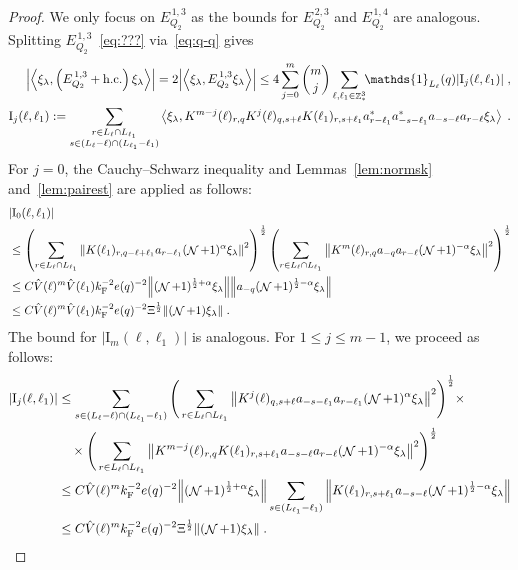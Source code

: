 \documentclass[12pt,a4paper]{article}
\numberwithin{equation}{section}
\newcommand{\1}{\mathbb{I}}
\newcommand{\F}{\mathrm{F}}
\newcommand{\I}{\mathrm{I}}
\DeclareMathOperator{\Z}{\mathbb{Z}}
\DeclareMathOperator{\NN}{\mathcal{N}}
\newcommand{\half}{\frac{1}{2}}
\newcommand{\eva}[1]{\left\langle #1 \right\rangle}
\theoremstyle{plain}
\theoremstyle{definition}
\theoremstyle{remark}
\theoremstyle{plain}
\theoremstyle{definition}
\theoremstyle{remark}
\begin{document}
\begin{proof}
We only focus on $ E^{\,1,3}_{Q_2} $ as the bounds for $ E^{\,2,3}_{Q_2} $ and $ E^{\,1,4}_{Q_2} $ are analogous. Splitting $ E^{\,1,3}_{Q_2} $~\eqref{eq:???} via~\eqref{eq:q-q} gives
\begin{equation} \label{eq:EQ2131}
\begin{aligned}
	\abs{\eva{\xi_\lambda,\left(E^{\,1,3}_{Q_2}+\mathrm{h.c.}\right) \xi_\lambda }} 
	= 2\abs{\eva{\xi_\lambda, E^{\,1,3}_{Q_2} \xi_\lambda }}
	\le 4 \sum_{j=0}^m {{m}\choose j} \sum\limits_{\ell,\ell_1  \in \Z^3_*}\!\! \mathds{1}_{L_\ell}(q) |\I_j(\ell, \ell_1)| \;,\\
	\I_j(\ell, \ell_1)
	:= \sum\limits_{\substack{r\in L_{\ell} \cap L_{\ell_1}\\ s \in (L_{\ell} - \ell) \cap (L_{\ell_1} - \ell_1)}}
		\eva{\xi_\lambda, K^{m-j}(\ell)_{r,q} K^{j}(\ell)_{q,s+\ell} K(\ell_1)_{r,s+\ell_1} a^*_{r-\ell_1} a^*_{-s-\ell_1} a_{-s-\ell} a_{r-\ell} \xi_\lambda} \;. \\
\end{aligned}
\end{equation}
For $ j = 0 $, the Cauchy--Schwarz inequality and Lemmas~\ref{lem:normsk} and~\ref{lem:pairest} are applied as follows:
\begin{align}
	&|\I_0(\ell, \ell_1)| \nonumber\\
	&\leq \left(\sum\limits_{r\in L_{\ell} \cap L_{\ell_1}} \norm{ K(\ell_1)_{r,q-\ell+\ell_1} a_{r-\ell_1}(\NN+1)^{\alpha} \xi_\lambda}^2\right)^\half
		\left(\sum\limits_{r\in L_{\ell} \cap L_{\ell_1}} \norm{ K^m(\ell)_{r,q} a_{-q}a_{r-\ell} (\NN+1)^{-\alpha} \xi_\lambda }^2 \right)^\half \nonumber\\
	&\leq C \hat{V}(\ell)^m \hat{V}(\ell_1) k_{\F}^{-2} e(q)^{-2} \norm{ (\NN+1)^{\half+\alpha} \xi_\lambda} \norm{ a_{-q} (\NN+1)^{\half-\alpha} \xi_\lambda } \nonumber \\
	&\leq C \hat{V}(\ell)^m \hat{V}(\ell_1) k_{\F}^{-2} e(q)^{-2} \Xi^{\half} \norm{ (\NN+1) \xi_\lambda} \;.
\end{align}
The bound for $ |\I_m(\ell, \ell_1)| $ is analogous. For $ 1 \le j \le m-1 $, we proceed as follows:
\begin{align}
	|\I_j(\ell, \ell_1)|
	&\leq  \sum\limits_{ s \in (L_{\ell}-\ell) \cap (L_{\ell_1}-\ell_1)}   \Bigg(\sum\limits_{r\in L_{\ell} \cap L_{\ell_1}} \norm{ K^{j}(\ell)_{q,s+\ell} a_{-s-\ell_1} a_{r-\ell_1} (\NN+1)^{\alpha}\xi_\lambda}^2\Bigg)^\half\nonumber \times \\ 
    		&\quad \times\Bigg( \sum\limits_{ r\in L_{\ell} \cap L_{\ell_1}}
		\norm{ K^{m-j}(\ell)_{r,q} K(\ell_1)_{r,s+\ell_1} a_{-s-\ell}a_{r-\ell} (\NN+1)^{-\alpha} \xi_\lambda }^2\Bigg)^\half \nonumber\\
	&\leq C \hat{V}(\ell)^m k_{\F}^{-2} e(q)^{-2} 
		\norm{(\NN+1)^{\half+\alpha}\xi_\lambda}
		\sum\limits_{ s \in (L_{\ell_1}-\ell_1)}
		\norm{ K(\ell_1)_{r,s+\ell_1} a_{-s-\ell} (\NN+1)^{\half-\alpha} \xi_\lambda } \nonumber \\
	&\leq C \hat{V}(\ell)^m k_{\F}^{-2} e(q)^{-2} \Xi^{\half}
		\norm{(\NN+1) \xi_\lambda} \;.
\end{align} 
\end{proof}
\end{document}
